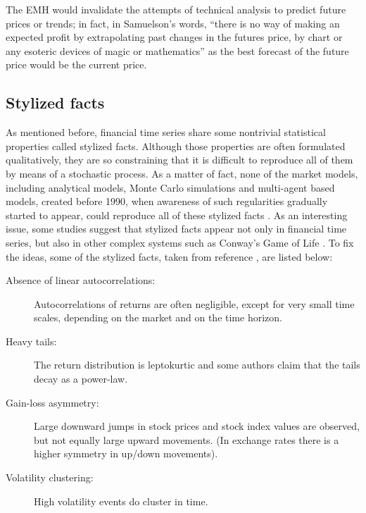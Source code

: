 \documentclass[a4paper]{jpconf}
\begin{document}
The EMH would invalidate the attempts of technical analysis to predict future prices or trends; in fact, in Samuelson's words, ``there is no way of making an expected profit by extrapolating past changes in the futures price, by chart or any esoteric devices of magic or mathematics'' \cite{Samuelson 2} as the best forecast of the future price would be the current price.

\subsection{Stylized facts}
\label{stylized}
As mentioned before, financial time series share some nontrivial statistical properties called stylized facts. Although those properties are often formulated qualitatively, they are so constraining that it is difficult to reproduce all of them by means of a stochastic process\cite{Rama}. As a matter of fact, none of the market models, including analytical models, Monte Carlo simulations and multi-agent based models, created before 1990, when awareness of such regularities gradually started to appear, could reproduce all of these stylized facts \cite{Lux}. As an interesting issue, some studies suggest that stylized facts appear not only in financial time series, but also in other complex systems such as Conway's Game of Life \cite{Hernandez}. To fix the ideas, some of the stylized facts, taken from reference \cite{Rama}, are listed below:

\begin{description}
\item[Absence of linear autocorrelations:] Autocorrelations of returns are often negligible, except for very small time scales, depending on the market and on the time horizon.
\item[Heavy tails:] The return distribution is leptokurtic and some authors claim that the tails decay as a power-law.
\item[Gain-loss asymmetry:] Large downward jumps in stock prices and stock index values are observed, but not equally large upward movements. (In exchange rates there is a higher symmetry in up/down movements).
\item[Volatility clustering:] High volatility events do cluster in time.
\end{description}
\end{document}
